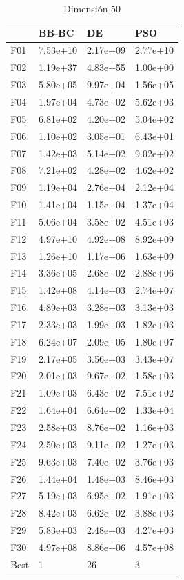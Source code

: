 \begin{table}[H]
    \begin{minipage}{.5\linewidth}
      \caption{Dimensión 50}
      \centering
      \begin{tabular}{llll}
        \toprule
        {} &     BB-BC &        DE &       PSO \\
        \midrule
        F01  &  7.53e+10 &  2.17e+09 &  2.77e+10 \\
        F02  &  1.19e+37 &  4.83e+55 &  1.00e+00 \\
        F03  &  5.80e+05 &  9.97e+04 &  1.56e+05 \\
        F04  &  1.97e+04 &  4.73e+02 &  5.62e+03 \\
        F05  &  6.81e+02 &  4.20e+02 &  5.04e+02 \\
        F06  &  1.10e+02 &  3.05e+01 &  6.43e+01 \\
        F07  &  1.42e+03 &  5.14e+02 &  9.02e+02 \\
        F08  &  7.21e+02 &  4.28e+02 &  4.62e+02 \\
        F09  &  1.19e+04 &  2.76e+04 &  2.12e+04 \\
        F10  &  1.41e+04 &  1.15e+04 &  1.37e+04 \\
        F11  &  5.06e+04 &  3.58e+02 &  4.51e+03 \\
        F12  &  4.97e+10 &  4.92e+08 &  8.92e+09 \\
        F13  &  1.26e+10 &  1.17e+06 &  1.63e+09 \\
        F14  &  3.36e+05 &  2.68e+02 &  2.88e+06 \\
        F15  &  1.42e+08 &  4.14e+03 &  2.74e+07 \\
        F16  &  4.89e+03 &  3.28e+03 &  3.13e+03 \\
        F17  &  2.33e+03 &  1.99e+03 &  1.82e+03 \\
        F18  &  6.24e+07 &  2.09e+05 &  1.80e+07 \\
        F19  &  2.17e+05 &  3.56e+03 &  3.43e+07 \\
        F20  &  2.01e+03 &  9.67e+02 &  1.58e+03 \\
        F21  &  1.09e+03 &  6.43e+02 &  7.51e+02 \\
        F22  &  1.64e+04 &  6.64e+02 &  1.33e+04 \\
        F23  &  2.58e+03 &  8.76e+02 &  1.16e+03 \\
        F24  &  2.50e+03 &  9.11e+02 &  1.27e+03 \\
        F25  &  9.63e+03 &  7.40e+02 &  3.76e+03 \\
        F26  &  1.44e+04 &  1.48e+03 &  8.46e+03 \\
        F27  &  5.19e+03 &  6.95e+02 &  1.91e+03 \\
        F28  &  8.42e+03 &  6.62e+02 &  3.88e+03 \\
        F29  &  5.83e+03 &  2.48e+03 &  4.27e+03 \\
        F30  &  4.97e+08 &  8.86e+06 &  4.57e+08 \\
        Best &         1 &        26 &         3 \\
        \bottomrule
        \end{tabular}
        

\end{minipage}
\end{table}
